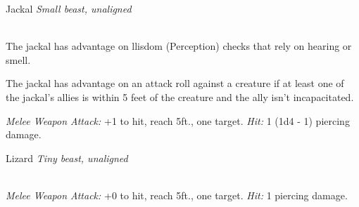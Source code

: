 \documentclass[10pt,twoside,twocolumn,openany]{book}
\begin{document}
\begin{monsterboxnobg}{Jackal}
	\textit{Small beast, unaligned}\\
	\hline
	\basics[
		armorclass	= 12,
		hitpoints 		= 3 (1d6),
		speed		= {40 ft.}
	]
	\hline
	\stats[
		STR	= \stat{8},
		DEX	= \stat{15},
		CON	= \stat{11},
		INT	= \stat{3},
		WIS	= \stat{12},
		CHA	= \stat{6}
	]
	\hline
	\details[
		skills			= {Perception +3},
		senses		= {passive Perception 13},
		languages		= {-},
		challenge		= 0
	]
	\hline \\[1mm]
	\begin{monsteraction}
		The jackal has advantage on llisdom (Perception) checks that rely on hearing or smell.
	\end{monsteraction}
	
	\begin{monsteraction}
		The jackal has advantage on an attack roll against a creature if at least one of the jackal's allies is within 5 feet of the creature and the ally isn't incapacitated.
	\end{monsteraction}
	\begin{monsteraction}[Bite]
		\textit{Melee Weapon Attack:} +1 to hit, reach 5ft., one target. \textit{Hit:} 1 (1d4 - 1) piercing damage.
	\end{monsteraction}
\end{monsterboxnobg}

\begin{monsterboxnobg}{Lizard}
	\textit{Tiny beast, unaligned}\\
	\hline
	\basics[
		armorclass	= 10,
		hitpoints 		= 2 (1d4),
		speed		= {20 ft., climb 20 ft.}
	]
	\hline
	\stats[
		STR	= \stat{2},
		DEX	= \stat{11},
		CON	= \stat{10},
		INT	= \stat{1},
		WIS	= \stat{8},
		CHA	= \stat{3}
	]
	\hline
	\details[
		skills			= {},
		senses		= {darkvision 30 ft., passive Perception 9},
		languages		= {-},
		challenge		= 0
	]
	\hline \\[1mm]
	\begin{monsteraction}[Bite]
		\textit{Melee Weapon Attack:} +0 to hit, reach 5ft., one target. \textit{Hit:} 1 piercing damage.
	\end{monsteraction}
\end{monsterboxnobg}
\end{document}
